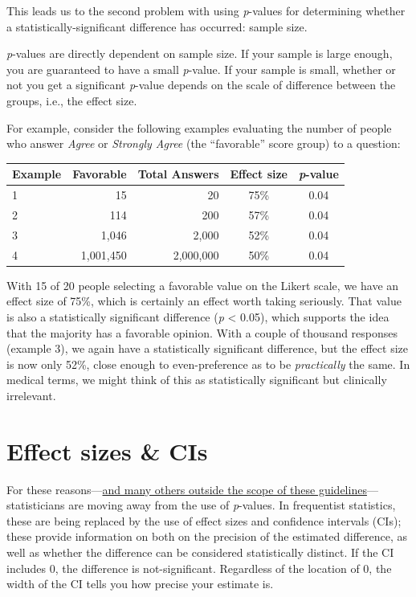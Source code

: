 \documentclass[]{book}
\begin{document}
This leads us to the second problem with using \emph{p}-values for
determining whether a statistically-significant difference has occurred:
sample size.

\emph{p}-values are directly dependent on sample size. If your sample is
large enough, you are guaranteed to have a small \emph{p}-value. If your
sample is small, whether or not you get a significant \emph{p}-value
depends on the scale of difference between the groups, i.e., the effect
size.

For example, consider the following examples evaluating the number of
people who answer \emph{Agree} or \emph{Strongly Agree} (the
``favorable'' score group) to a question:

\begin{longtable}[]{@{}lrrcc@{}}
\toprule
Example & Favorable & Total Answers & Effect size &
\emph{p}-value\tabularnewline
\midrule
\endhead
1 & 15 & 20 & 75\% & 0.04\tabularnewline
2 & 114 & 200 & 57\% & 0.04\tabularnewline
3 & 1,046 & 2,000 & 52\% & 0.04\tabularnewline
4 & 1,001,450 & 2,000,000 & 50\% & 0.04\tabularnewline
\bottomrule
\end{longtable}

With 15 of 20 people selecting a favorable value on the Likert scale, we
have an effect size of 75\%, which is certainly an effect worth taking
seriously. That value is also a statistically significant difference
(\emph{p} \textless{} 0.05), which supports the idea that the majority
has a favorable opinion. With a couple of thousand responses (example
3), we again have a statistically significant difference, but the effect
size is now only 52\%, close enough to even-preference as to be
\emph{practically} the same. In medical terms, we might think of this as
statistically significant but clinically irrelevant.

\section{Effect sizes \& CIs}\label{effect-sizes-cis}

For these
reasons---\href{http://www.tandfonline.com/doi/full/10.1080/00031305.2016.1154108}{and
many others outside the scope of these guidelines}---statisticians are
moving away from the use of \emph{p}-values. In frequentist statistics,
these are being replaced by the use of effect sizes and confidence
intervals (CIs); these provide information on both on the precision of
the estimated difference, as well as whether the difference can be
considered statistically distinct. If the CI includes 0, the difference
is not-significant. Regardless of the location of 0, the width of the CI
tells you how precise your estimate is.
\end{document}
